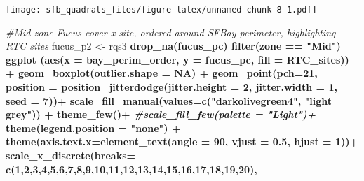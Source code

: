 \documentclass[
]{article}
\newenvironment{Shaded}{\begin{snugshade}}{\end{snugshade}}
\newcommand{\CommentTok}[1]{\textcolor[rgb]{0.56,0.35,0.01}{\textit{#1}}}
\newcommand{\DataTypeTok}[1]{\textcolor[rgb]{0.13,0.29,0.53}{#1}}
\newcommand{\DecValTok}[1]{\textcolor[rgb]{0.00,0.00,0.81}{#1}}
\newcommand{\FloatTok}[1]{\textcolor[rgb]{0.00,0.00,0.81}{#1}}
\newcommand{\KeywordTok}[1]{\textcolor[rgb]{0.13,0.29,0.53}{\textbf{#1}}}
\newcommand{\NormalTok}[1]{#1}
\newcommand{\OperatorTok}[1]{\textcolor[rgb]{0.81,0.36,0.00}{\textbf{#1}}}
\newcommand{\OtherTok}[1]{\textcolor[rgb]{0.56,0.35,0.01}{#1}}
\newcommand{\StringTok}[1]{\textcolor[rgb]{0.31,0.60,0.02}{#1}}
\begin{document}
\texttt{[image: sfb\_quadrats\_files/figure-latex/unnamed-chunk-8-1.pdf]}

\begin{Shaded}
\begin{Highlighting}[]
\CommentTok{#Mid zone Fucus cover x site, ordered around SFBay perimeter, highlighting RTC sites}
\NormalTok{fucus_p2 <-}\StringTok{ }\NormalTok{rqs3 }\OperatorTok{%>%}\StringTok{ }
\StringTok{  }\KeywordTok{drop_na}\NormalTok{(fucus_pc) }\OperatorTok{%>%}\StringTok{ }
\StringTok{  }\KeywordTok{filter}\NormalTok{(zone }\OperatorTok{==}\StringTok{ "Mid"}\NormalTok{) }\OperatorTok{%>%}\StringTok{ }
\StringTok{  }\KeywordTok{ggplot}\NormalTok{ (}\KeywordTok{aes}\NormalTok{(}\DataTypeTok{x =}\NormalTok{ bay_perim_order, }\DataTypeTok{y =}\NormalTok{ fucus_pc, }\DataTypeTok{fill =}\NormalTok{ RTC_sites)) }\OperatorTok{+}
\StringTok{  }\KeywordTok{geom_boxplot}\NormalTok{(}\DataTypeTok{outlier.shape =} \OtherTok{NA}\NormalTok{) }\OperatorTok{+}
\StringTok{  }\KeywordTok{geom_point}\NormalTok{(}\DataTypeTok{pch=}\DecValTok{21}\NormalTok{, }\DataTypeTok{position =} \KeywordTok{position_jitterdodge}\NormalTok{(}\DataTypeTok{jitter.height =} \DecValTok{2}\NormalTok{, }\DataTypeTok{jitter.width =} \DecValTok{1}\NormalTok{, }\DataTypeTok{seed =} \DecValTok{7}\NormalTok{))}\OperatorTok{+}
\StringTok{  }\KeywordTok{scale_fill_manual}\NormalTok{(}\DataTypeTok{values=}\KeywordTok{c}\NormalTok{(}\StringTok{"darkolivegreen4"}\NormalTok{, }\StringTok{"light grey"}\NormalTok{)) }\OperatorTok{+}
\StringTok{  }\KeywordTok{theme_few}\NormalTok{()}\OperatorTok{+}
\StringTok{  }\CommentTok{#scale_fill_few(palette = "Light")+}
\StringTok{  }\KeywordTok{theme}\NormalTok{(}\DataTypeTok{legend.position =} \StringTok{"none"}\NormalTok{) }\OperatorTok{+}
\StringTok{  }\KeywordTok{theme}\NormalTok{(}\DataTypeTok{axis.text.x=}\KeywordTok{element_text}\NormalTok{(}\DataTypeTok{angle =} \DecValTok{90}\NormalTok{, }\DataTypeTok{vjust =} \FloatTok{0.5}\NormalTok{, }\DataTypeTok{hjust =} \DecValTok{1}\NormalTok{))}\OperatorTok{+}
\StringTok{  }\KeywordTok{scale_x_discrete}\NormalTok{(}\DataTypeTok{breaks=} \KeywordTok{c}\NormalTok{(}\DecValTok{1}\NormalTok{,}\DecValTok{2}\NormalTok{,}\DecValTok{3}\NormalTok{,}\DecValTok{4}\NormalTok{,}\DecValTok{5}\NormalTok{,}\DecValTok{6}\NormalTok{,}\DecValTok{7}\NormalTok{,}\DecValTok{8}\NormalTok{,}\DecValTok{9}\NormalTok{,}\DecValTok{10}\NormalTok{,}\DecValTok{11}\NormalTok{,}\DecValTok{12}\NormalTok{,}\DecValTok{13}\NormalTok{,}\DecValTok{14}\NormalTok{,}\DecValTok{15}\NormalTok{,}\DecValTok{16}\NormalTok{,}\DecValTok{17}\NormalTok{,}\DecValTok{18}\NormalTok{,}\DecValTok{19}\NormalTok{,}\DecValTok{20}\NormalTok{), }
}}}
\end{Highlighting}
\end{Shaded}
\end{document}
